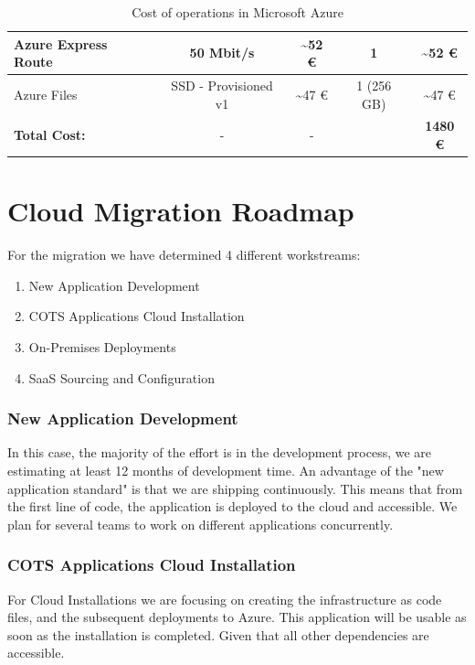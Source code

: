 \documentclass{llncs}
\begin{document}
\begin{table}[htbp]
\begin{tabular}{|l|c|c|c|c|}
        \hline
        Azure Express Route          & 50 Mbit/s             & \textasciitilde 52 €                 & 1                      & \textasciitilde 52 €                \\
        \hline
        Azure Files                  & SSD - Provisioned v1  & \textasciitilde 47 €                 & 1 (256 GB)             & \textasciitilde 47 €                \\
        \hline
        \textbf{Total Cost:}         & -                     & -                                    &                        & \textbf{1480  €}                    \\
        \hline
    \end{tabular}
    \caption{Cost of operations in Microsoft Azure}
    \label{tab:Cost_Operation_Monthly}
\end{table}


\section{Cloud Migration Roadmap}

For the migration we have determined 4 different workstreams:
\begin{enumerate}
    \item New Application Development
    \item COTS Applications Cloud Installation
    \item On-Premises Deployments
    \item SaaS Sourcing and Configuration
\end{enumerate}

\subsubsection{New Application Development}
In this case, the majority of the effort is in the development process, we are estimating at least 12 months of development time. An advantage of the "new application standard" is that we are shipping continuously.
This means that from the first line of code, the application is deployed to the cloud and accessible. We plan for several teams to work on different applications concurrently.

\subsubsection{COTS Applications Cloud Installation}
For Cloud Installations we are focusing on creating the infrastructure as code files, and the subsequent deployments to Azure. This application will be usable as soon as the installation is completed. Given that all other dependencies are accessible.
\end{document}
